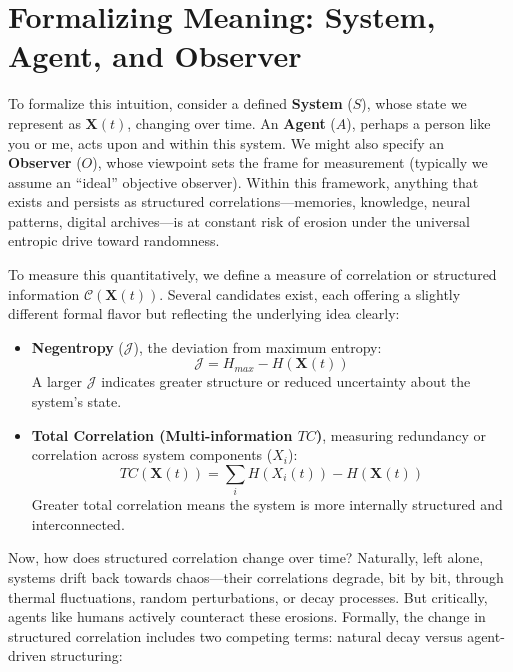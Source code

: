 \section{Formalizing Meaning: System, Agent, and Observer}\label{sec:meaning-formalism}

To formalize this intuition, consider a defined \textbf{System} ($S$), whose state we represent as $\mathbf{X}(t)$, changing over time. An \textbf{Agent} ($A$), perhaps a person like you or me, acts upon and within this system. We might also specify an \textbf{Observer} ($O$), whose viewpoint sets the frame for measurement (typically we assume an ``ideal'' objective observer). Within this framework, anything that exists and persists as structured correlations---memories, knowledge, neural patterns, digital archives---is at constant risk of erosion under the universal entropic drive toward randomness.

To measure this quantitatively, we define a measure of correlation or structured information $\mathcal{C}(\mathbf{X}(t))$. Several candidates exist, each offering a slightly different formal flavor but reflecting the underlying idea clearly:

\begin{itemize}
    \item \textbf{Negentropy} ($\mathcal{J}$), the deviation from maximum entropy:
    \begin{equation*}
        \mathcal{J} = H_{max} - H(\mathbf{X}(t))
    \end{equation*}
    A larger $\mathcal{J}$ indicates greater structure or reduced uncertainty about the system's state.
    \item \textbf{Total Correlation (Multi-information $TC$)}, measuring redundancy or correlation across system components ($X_i$):
    \begin{equation*}
        TC(\mathbf{X}(t)) = \sum_i H(X_i(t)) - H(\mathbf{X}(t))
    \end{equation*}
    Greater total correlation means the system is more internally structured and interconnected.
\end{itemize}

Now, how does structured correlation change over time? Naturally, left alone, systems drift back towards chaos---their correlations degrade, bit by bit, through thermal fluctuations, random perturbations, or decay processes. But critically, agents like humans actively counteract these erosions. Formally, the change in structured correlation includes two competing terms: natural decay versus agent-driven structuring:

